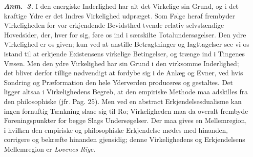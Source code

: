 \documentclass[12pt]{book}
\newcommand{\anm}[1]{\emph{\textbf{Anm.~#1.}}}
\newcommand{\opage}[1]{\marginnote{\footnotesize\textit{[#1]}}}
\begin{document}
\anm{3} I den energiske Inderlighed har alt det Virkelige sin Grund, og i det kraftige Ydre er
det Indres Virkelighed udpræget. Som Følge heraf frembyder Virkeligheden for vor erkjendende
Bevidsthed tvende relativ selvstændige Hovedsider, der, hver for sig, føre os ind i særskilte
Totalundersøgelser. Den ydre Virkelighed er os given; kun ved at anstille Betragtninger og
Iagttagelser see vi os istand til at
\opage{144} %
erkjende Existensens virkelige Betingelser, og trænge ind i Tingenes Væsen. Men den ydre
Virkelighed har sin Grund i den virksomme Inderlighed; det bliver derfor tillige nødvendigt at
fordybe sig i de Anlæg og Evner, ved hvis Sondring og Præformation den hele Yderverden
produceres og gestaltes. Det ligger altsaa i Virkelighedens Begreb, at den empiriske Methode maa
adskilles fra den philosophiske (jfr. Pag. 25). Men ved en abstract Erkjendelsesdualisme kan
ingen fornuftig Tænkning slaae sig til Ro; Virkeligheden maa da overalt frembyde
Foreningspunkter for begge Slags Undersøgelser. Der maa gives en Mellemregion, i hvilken den
empiriske og philosophiske Erkjendelse mødes med hinanden, corrigere og bekræfte hinanden
gjensidig; denne Virkelighedens og Erkjendelsens Mellemregion er \emph{Lovenes Rige}.
\end{document}
